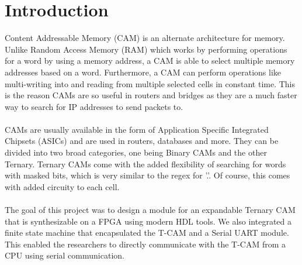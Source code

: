 \section{Introduction}
Content Addressable Memory (CAM) is an alternate architecture for memory. Unlike Random Access Memory (RAM) which works by 
performing operations for a word by using a memory address, a CAM is able to select multiple memory addresses based on a word. 
Furthermore, a CAM can perform operations like multi-writing into and reading from multiple selected cells in constant time.
This is the reason CAMs are so useful in routers and bridges as they are a much faster way to search for IP addresses to send packets to.
\\\\  
CAMs are usually available in the form of Application Specific Integrated Chipsets (ASICs) and are used in routers, databases and more.
They can be divided into two broad categories, one being Binary CAMs and the other Ternary. 
Ternary CAMs come with the added flexibility of searching for words with masked bits, which is very similar to the regex for '.'. 
Of course, this comes with added circuity to each cell. 
\\\\ 
The goal of this project was to design a module for an expandable Ternary CAM that is synthesizable on a FPGA using modern HDL tools. 
We also integrated a finite state machine that encapsulated the T-CAM and a Serial UART module. 
This enabled the researchers to directly communicate with the T-CAM from a CPU using serial communication. 
